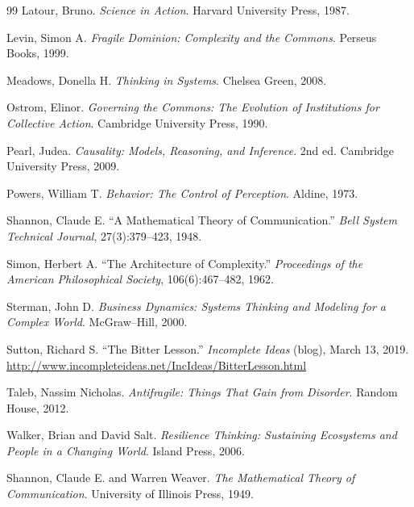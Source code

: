 \documentclass[12pt, a4paper]{article}
\theoremstyle{flyxion}
\begin{document}
\begin{thebibliography}{99}
Latour, Bruno.
\textit{Science in Action}.
Harvard University Press, 1987.

Levin, Simon A.
\textit{Fragile Dominion: Complexity and the Commons}.
Perseus Books, 1999.

Meadows, Donella H.
\textit{Thinking in Systems}.
Chelsea Green, 2008.

Ostrom, Elinor.
\textit{Governing the Commons: The Evolution of Institutions for Collective Action}.
Cambridge University Press, 1990.

Pearl, Judea.
\textit{Causality: Models, Reasoning, and Inference}.
2nd ed.
Cambridge University Press, 2009.

Powers, William T.
\textit{Behavior: The Control of Perception}.
Aldine, 1973.

Shannon, Claude E.
``A Mathematical Theory of Communication.''
\textit{Bell System Technical Journal},
27(3):379--423, 1948.

Simon, Herbert A.
``The Architecture of Complexity.''
\textit{Proceedings of the American Philosophical Society},
106(6):467--482, 1962.

Sterman, John D.
\textit{Business Dynamics: Systems Thinking and Modeling for a Complex World}.
McGraw--Hill, 2000.

Sutton, Richard S.
``The Bitter Lesson.''
\textit{Incomplete Ideas} (blog),
March 13, 2019.
\url{http://www.incompleteideas.net/IncIdeas/BitterLesson.html}

Taleb, Nassim Nicholas.
\textit{Antifragile: Things That Gain from Disorder}.
Random House, 2012.

Walker, Brian and David Salt.
\textit{Resilience Thinking:
Sustaining Ecosystems and People in a Changing World}.
Island Press, 2006.

Shannon, Claude E. and Warren Weaver.
\textit{The Mathematical Theory of Communication}.
University of Illinois Press, 1949.

\end{thebibliography}
\end{document}
